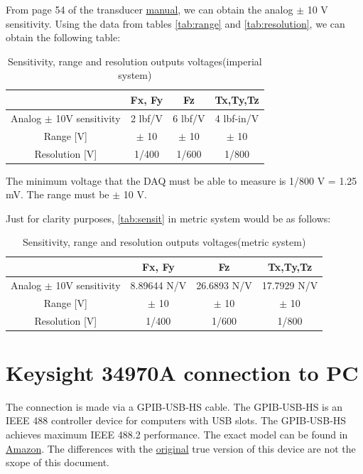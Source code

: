 \documentclass[a4paper]{article}
\begin{document}
From page 54 of the transducer \href{https://www.ati-ia.com/app_content/documents/9620-05-Transducer%20Section.pdf}{manual}, we can obtain the analog $\pm$ 10 V sensitivity. Using the data from tables \ref{tab:range} and \ref{tab:resolution}, we can obtain the following table:

\begin{table}[h!]
	\centering
	\caption{Sensitivity, range and resolution outputs voltages\label{tab:sensit} (imperial system)}
	\begin{tabular}{||c | c | c | c ||} 
		\hline
		 & Fx, Fy & Fz & Tx,Ty,Tz \\ [0.5ex] 
		\hline\hline
		Analog $\pm$ 10V sensitivity & 2 lbf/V & 6 lbf/V & 4 lbf-in/V\\ 
		\hline
		Range [V] & $\pm$ 10 & $\pm$ 10 & $\pm$ 10 \\
		\hline
		Resolution [V] & 1/400 & 1/600 & 1/800 \\
		\hline
	\end{tabular}
\end{table}

The minimum voltage that the DAQ must be able to measure is 1/800 V = 1.25 mV. The range must be $\pm$ 10 V.

Just for clarity purposes, \autoref{tab:sensit} in metric system would be as follows:

\begin{table}[h!]
	\centering
	\caption{Sensitivity, range and resolution outputs voltages\label{tab:sensit2} (metric system)}
	\begin{tabular}{||c | c | c | c ||} 
		\hline
		& Fx, Fy & Fz & Tx,Ty,Tz \\ [0.5ex] 
		\hline\hline
		Analog $\pm$ 10V sensitivity & 8.89644 N/V & 26.6893 N/V & 17.7929 N/V\\ 
		\hline
		Range [V] & $\pm$ 10 & $\pm$ 10 & $\pm$ 10 \\
		\hline
		Resolution [V] & 1/400 & 1/600 & 1/800 \\
		\hline
	\end{tabular}
\end{table}


\section{Keysight 34970A connection to PC}
The connection is made via a GPIB‑USB‑HS cable. The GPIB‑USB‑HS is an IEEE 488 controller device for computers with USB slots. The GPIB‑USB‑HS achieves maximum IEEE 488.2 performance. The exact model can be found in \hyperref{https://www.amazon.com/Kanonaki-GPIB-USB-HS-Interface-Adapter-Controller/dp/B07Q84XJJF}{category}{name}{Amazon}. The differences with the \hyperref{https://www.newark.com/ni/780570-01/gpib-usb-hs-gpib-control-device/dp/14AJ5119}{category}{name}{original} true version of this device are not the sxope of this document. 
\end{document}

